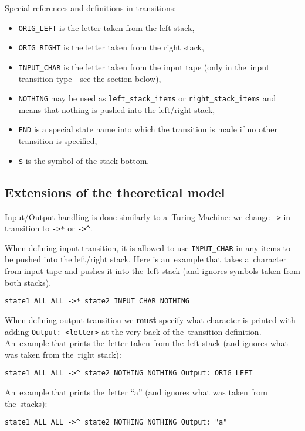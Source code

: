 \documentclass[english,shortabstract,mgr]{iithesis}
\begin{document}
Special references and definitions in transitions:
\begin{itemize}
  \item \texttt{ORIG\_LEFT} is the letter taken from the left stack,
  \item \texttt{ORIG\_RIGHT} is the letter taken from the right stack,
  \item \texttt{INPUT\_CHAR} is the letter taken from the input tape
      (only in the~input transition type - see the section below),
  \item \texttt{NOTHING} may be used as \texttt{left\_stack\_items} or \texttt{right\_stack\_items}
      and means that nothing is pushed into the left/right stack,
  \item \texttt{END} is a special state name into which the transition is made if no other transition is specified,
  \item \texttt{\$} is the symbol of the stack bottom.
\end{itemize}

\subsection {Extensions of the theoretical model}

Input/Output handling is done similarly to a~Turing Machine: we change \texttt{->} in transition
to \texttt{->*} or \texttt{->\^}.

When defining input transition, it is allowed to use \texttt{INPUT\_CHAR} in any items
to be pushed into the left/right stack. Here is an~example that takes a~character from input
tape and pushes it into the~left stack (and ignores symbols taken from both stacks).
\begin{verbatim}
state1 ALL ALL ->* state2 INPUT_CHAR NOTHING
\end{verbatim}

When defining output transition we \textbf{must} specify what character is printed
with adding \texttt{Output: <letter>} at the very back of the~transition definition.
An~example that prints the~letter taken from the~left stack (and ignores what was
taken from the~right stack):
\begin{verbatim}
state1 ALL ALL ->^ state2 NOTHING NOTHING Output: ORIG_LEFT
\end{verbatim}
An~example that prints the~letter ``a'' (and ignores what was taken from the~stacks):
\begin{verbatim}
state1 ALL ALL ->^ state2 NOTHING NOTHING Output: "a"
\end{verbatim}
\end{document}

